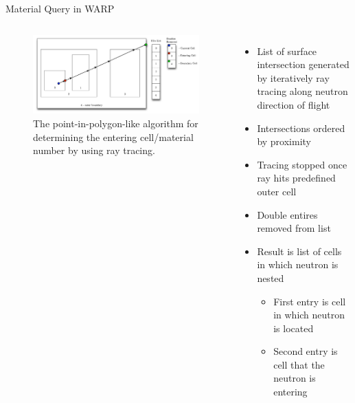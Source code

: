 \documentclass[xcolor=x11names,compress, handout]{beamer}
\renewcommand{\(}{\begin{columns}}
\renewcommand{\)}{\end{columns}}
\newcommand{\<}[1]{\begin{column}{#1}}
\renewcommand{\>}{\end{column}}
\begin{document}
\begin{frame}{Material Query in WARP \cite{warp}}
\pause
\begin{columns}
	\begin{figure}[h!]
	\includegraphics[width=2.5 in]{../figs/whereami}
	\caption{The point-in-polygon-like algorithm for determining the entering cell/material number by 
	using ray tracing. \label{whereami}}
	\end{figure}
	\begin{itemize}
	\pause
	\item{List of surface intersection generated by iteratively ray tracing along neutron direction of
	flight}
	\pause
	\item{Intersections ordered by proximity}
	\pause
	\item{Tracing stopped once ray hits predefined outer cell}
	\pause
	\item{Double entires removed from list}
	\pause
	\item{Result is list of cells in which neutron is nested}
		\begin{itemize}
		\pause
		\item{First entry is cell in which neutron is located}
		\pause
		\item{Second entry is cell that the neutron is entering}
		\end{itemize}
	\end{itemize}
\end{columns}
\end{frame}
\end{document}

